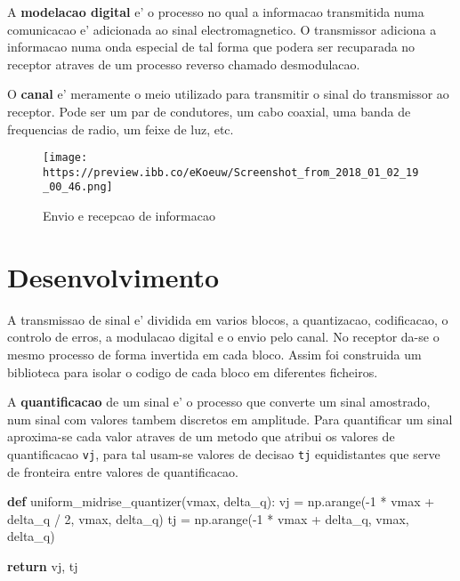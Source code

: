 \documentclass[11pt]{article}
\makeatletter
\def\maxwidth{\ifdim\Gin@nat@width>\linewidth\linewidth
    \else\Gin@nat@width\fi}
\let\Oldincludegraphics\includegraphics
\renewcommand{\includegraphics}[1]{\Oldincludegraphics[width=.8\maxwidth]{#1}}
\newenvironment{Shaded}{}{}
\newcommand{\KeywordTok}[1]{\textcolor[rgb]{0.00,0.44,0.13}{\textbf{{#1}}}}
\newcommand{\DecValTok}[1]{\textcolor[rgb]{0.25,0.63,0.44}{{#1}}}
\newcommand{\NormalTok}[1]{{#1}}
\newcommand{\ControlFlowTok}[1]{\textcolor[rgb]{0.00,0.44,0.13}{\textbf{{#1}}}}
\newcommand{\OperatorTok}[1]{\textcolor[rgb]{0.40,0.40,0.40}{{#1}}}
\makeatother
\begin{document}
A \textbf{modelacao digital} e' o processo no qual a informacao
transmitida numa comunicacao e' adicionada ao sinal electromagnetico. O
transmissor adiciona a informacao numa onda especial de tal forma que
podera ser recuparada no receptor atraves de um processo reverso chamado
desmodulacao.

O \textbf{canal} e' meramente o meio utilizado para transmitir o sinal
do transmissor ao receptor. Pode ser um par de condutores, um cabo
coaxial, uma banda de frequencias de radio, um feixe de luz, etc.

\begin{figure}
\centering
\texttt{[image: https://preview.ibb.co/eKoeuw/Screenshot\_from\_2018\_01\_02\_19\_00\_46.png]}
\caption{Envio e recepcao de informacao}
\end{figure}

    \section{Desenvolvimento}\label{desenvolvimento}

A transmissao de sinal e' dividida em varios blocos, a quantizacao,
codificacao, o controlo de erros, a modulacao digital e o envio pelo
canal. No receptor da-se o mesmo processo de forma invertida em cada
bloco. Assim foi construida um biblioteca para isolar o codigo de cada
bloco em diferentes ficheiros.

A \textbf{quantificacao} de um sinal e' o processo que converte um sinal
amostrado, num sinal com valores tambem discretos em amplitude. Para
quantificar um sinal aproxima-se cada valor atraves de um metodo que
atribui os valores de quantificacao \texttt{vj}, para tal usam-se
valores de decisao \texttt{tj} equidistantes que serve de fronteira
entre valores de quantificacao.

\begin{Shaded}
\begin{Highlighting}[]
\KeywordTok{def} \NormalTok{uniform_midrise_quantizer(vmax, delta_q):}
    \NormalTok{vj }\OperatorTok{=} \NormalTok{np.arange(}\OperatorTok{-}\DecValTok{1} \OperatorTok{*} \NormalTok{vmax }\OperatorTok{+} \NormalTok{delta_q }\OperatorTok{/} \DecValTok{2}\NormalTok{, vmax, delta_q)}
    \NormalTok{tj }\OperatorTok{=} \NormalTok{np.arange(}\OperatorTok{-}\DecValTok{1} \OperatorTok{*} \NormalTok{vmax }\OperatorTok{+} \NormalTok{delta_q, vmax, delta_q)}

    \ControlFlowTok{return} \NormalTok{vj, tj}
\end{Highlighting}
\end{Shaded}
\end{document}
